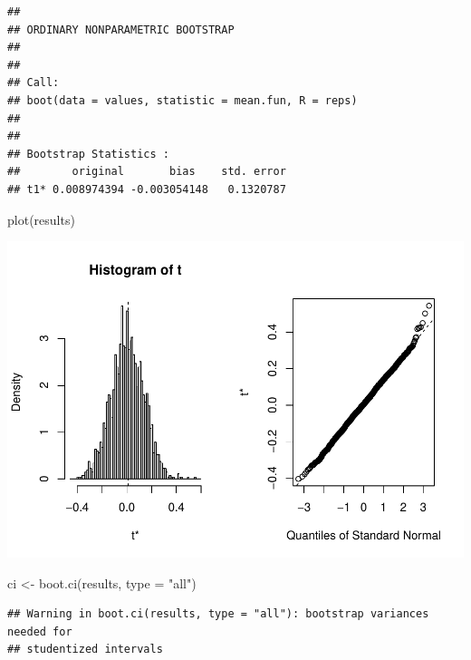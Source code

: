 \documentclass[12pt]{article}
\newenvironment{Shaded}{\begin{snugshade}}{\end{snugshade}}
\newcommand{\AttributeTok}[1]{\textcolor[rgb]{0.77,0.63,0.00}{#1}}
\newcommand{\FunctionTok}[1]{\textcolor[rgb]{0.00,0.00,0.00}{#1}}
\newcommand{\NormalTok}[1]{#1}
\newcommand{\OtherTok}[1]{\textcolor[rgb]{0.56,0.35,0.01}{#1}}
\newcommand{\StringTok}[1]{\textcolor[rgb]{0.31,0.60,0.02}{#1}}
\begin{document}
\begin{verbatim}
## 
## ORDINARY NONPARAMETRIC BOOTSTRAP
## 
## 
## Call:
## boot(data = values, statistic = mean.fun, R = reps)
## 
## 
## Bootstrap Statistics :
##        original       bias    std. error
## t1* 0.008974394 -0.003054148   0.1320787
\end{verbatim}

\begin{Shaded}
\begin{Highlighting}[]
\FunctionTok{plot}\NormalTok{(results)}
\end{Highlighting}
\end{Shaded}

\includegraphics{paper_files/figure-latex/unnamed-chunk-2-1.pdf}

\begin{Shaded}
\begin{Highlighting}[]
\NormalTok{ci }\OtherTok{\textless{}{-}} \FunctionTok{boot.ci}\NormalTok{(results, }\AttributeTok{type =} \StringTok{"all"}\NormalTok{)}
\end{Highlighting}
\end{Shaded}

\begin{verbatim}
## Warning in boot.ci(results, type = "all"): bootstrap variances needed for
## studentized intervals
\end{verbatim}
\end{document}
